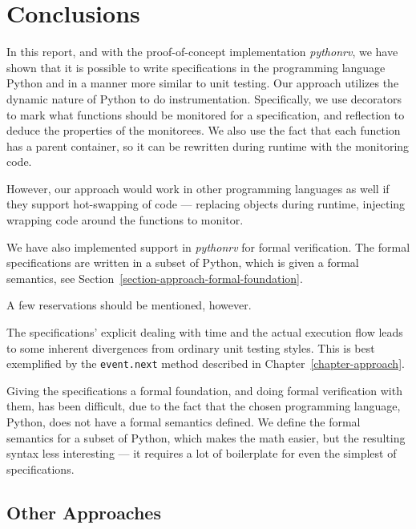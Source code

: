 
\pagestyle{newchap}
\chapter{Conclusions} \label{chapter-conclusions}

In this report, and with the proof-of-concept implementation \textit{pythonrv},
we have shown that it is possible to write specifications in the programming
language Python and in a manner more similar to unit testing. Our approach
utilizes the dynamic nature of Python to do instrumentation. Specifically, we
use decorators to mark what functions should be monitored for a specification,
and reflection to deduce the properties of the monitorees. We also use the fact
that each function has a parent container, so it can be rewritten during
runtime with the monitoring code.

However, our approach would work in other programming languages as well if they
support hot-swapping of code --- replacing objects during runtime, injecting
wrapping code around the functions to monitor.

We have also implemented support in \textit{pythonrv} for formal verification.
The formal specifications are written in a subset of Python, which is given a
formal semantics, see Section~\ref{section-approach-formal-foundation}.

A few reservations should be mentioned, however.

The specifications' explicit dealing with time and the actual
execution flow leads to some inherent divergences from ordinary unit testing
styles. This is best exemplified by the \texttt{event.next} method described in
Chapter~\ref{chapter-approach}.

Giving the specifications a formal foundation, and doing formal verification
with them, has been difficult, due to the fact that the chosen programming
language, Python, does not have a formal semantics defined. We define the
formal semantics for a subset of Python, which makes the math easier, but the
resulting syntax less interesting --- it requires a lot of boilerplate
for even the simplest of specifications.

\section{Other Approaches}

